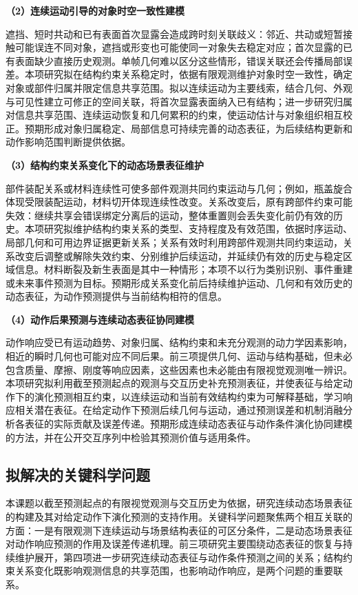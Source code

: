 \noindent\textbf{（2）连续运动引导的对象时空一致性建模}

遮挡、短时共动和已有表面首次显露会造成跨时刻关联歧义：邻近、共动或短暂接触可能误连不同对象，遮挡或形变也可能使同一对象失去稳定对应；首次显露的已有表面缺少直接历史观测。单帧几何难以区分这些情形，错误关联还会传播局部误差。本项研究拟在结构约束关系稳定时，依据有限观测维护对象时空一致性，确定对象或部件归属并限定信息共享范围。拟以连续运动为主要线索，结合几何、外观与可见性建立可修正的空间关联，将首次显露表面纳入已有结构；进一步研究归属对信息共享范围、连续运动恢复和几何累积的约束，使运动估计与对象组织相互校正。预期形成对象归属稳定、局部信息可持续完善的动态表征，为后续结构更新和动作影响范围判断提供依据。

\noindent\textbf{（3）结构约束关系变化下的动态场景表征维护}

部件装配关系或材料连续性可使多部件观测共同约束运动与几何；例如，瓶盖旋合体现受限装配运动，材料切开体现连续性改变。关系改变后，原有跨部件约束可能失效：继续共享会错误绑定分离后的运动，整体重置则会丢失变化前仍有效的历史。本项研究拟维护结构约束关系的类型、支持程度及有效范围，依据时序运动、局部几何和可用边界证据更新关系；关系有效时利用跨部件观测共同约束运动，关系改变后调整或解除失效约束、分别维护后续运动，并延续仍有效的历史与稳定区域信息。材料断裂及新生表面是其中一种情形；本项不以行为类别识别、事件重建或未来事件预测为目标。预期形成关系变化前后持续维护运动、几何和有效历史的动态表征，为动作预测提供与当前结构相符的信息。

\noindent\textbf{（4）动作后果预测与连续动态表征协同建模}

动作响应受已有运动趋势、对象归属、结构约束和未充分观测的动力学因素影响，相近的瞬时几何也可能对应不同后果。前三项提供几何、运动与结构基础，但未必包含质量、摩擦、刚度等响应因素，这些因素也未必能由有限视觉观测唯一辨识。本项研究拟利用截至预测起点的观测与交互历史补充预测表征，并使表征与给定动作下的演化预测相互约束，以连续运动和当前有效结构约束为可解释基础，学习响应相关潜在表征。在给定动作下预测后续几何与运动，通过预测误差和机制消融分析各表征的实际贡献及误差传递。预期形成连续动态表征与动作条件演化协同建模的方法，并在公开交互序列中检验其预测价值与适用条件。


\subsection{拟解决的关键科学问题}

本课题以截至预测起点的有限视觉观测与交互历史为依据，研究连续动态场景表征的构建及其对给定动作下演化预测的支持作用。关键科学问题聚焦两个相互关联的方面：一是有限观测下连续运动与场景结构表征的可区分条件，二是动态场景表征对动作响应预测的作用及误差传递机理。前三项研究主要围绕动态表征的恢复与持续维护展开，第四项进一步研究连续动态表征与动作条件预测之间的关系；结构约束关系变化既影响观测信息的共享范围，也影响动作响应，是两个问题的重要联系。

